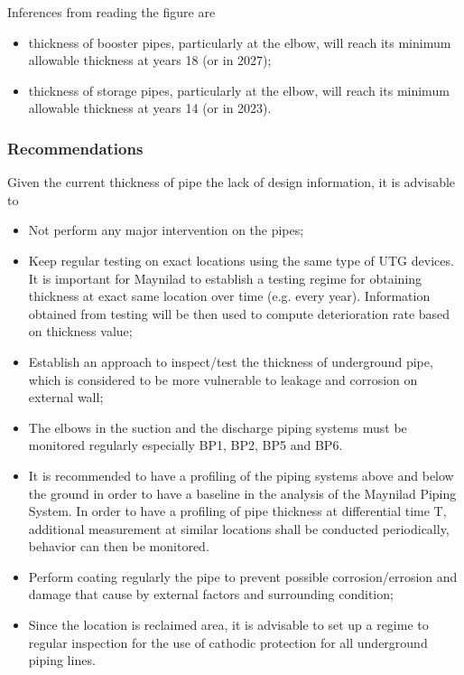 Inferences from reading the figure are

\begin{itemize}
\item thickness of booster pipes, particularly at the elbow, will reach its minimum allowable thickness at years 18 (or in 2027);
\item thickness of storage pipes, particularly at the elbow, will reach its minimum allowable thickness at years 14 (or in 2023).
\end{itemize}











\subsubsection{Recommendations}
Given the current thickness of pipe the lack of design information, it is advisable to 
\begin{itemize}
\item Not perform any major intervention on the pipes;
\item Keep regular testing on exact locations using the same type of UTG devices. It is important for Maynilad to establish a testing regime for obtaining thickness at exact same location over time (e.g. every year). Information obtained from testing will be then used to compute deterioration rate based on thickness value;
\item Establish an approach to inspect/test the thickness of underground pipe, which is considered to be more vulnerable to leakage and corrosion on external wall;
\item The elbows in the suction and the discharge piping systems must be monitored regularly especially BP1, BP2, BP5 and BP6.
\item	It is recommended to have a profiling of the piping systems above and below the ground in order to have a baseline in the analysis of the Maynilad Piping System. In order to have a profiling of pipe thickness at differential time T, additional measurement at similar locations shall be conducted periodically, behavior can then be monitored.
\item Perform coating regularly the pipe to prevent possible corrosion/errosion and damage that cause by external factors and surrounding condition;
\item Since the location is reclaimed area, it is advisable to set up a regime to regular inspection for the use of cathodic protection for all underground piping lines.
\end{itemize}

